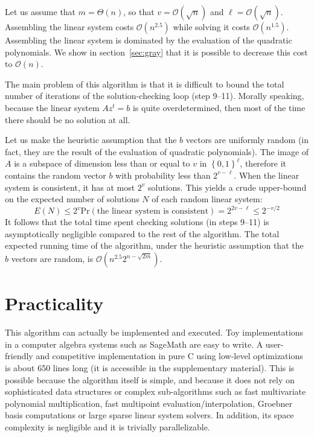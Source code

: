 \documentclass[a4paper,UKenglish,cleveref, autoref]{lipics-v2019}
\newcommand{\bits}{\left\{0, 1\right\}}
\newcommand{\bigO}[1]{\ensuremath{\mathcal{O}\left( #1 \right)} }
\newcommand{\bigTheta}[1]{\ensuremath{\Theta\left( #1 \right)} }
\begin{document}
Let us assume that $m = \bigTheta{n}$, so that $v = \bigO{\sqrt{n}}$ and
$\ell = \bigO{\sqrt{n}}$. Assembling the linear system costs $\bigO{n^{2.5}}$
while solving it costs $\bigO{n^{1.5}}$. Assembling the linear system is
dominated by the evaluation of the quadratic polynomials. We show in
section~\ref{sec:gray} that it is possible to decrease this cost to $\bigO{n}$.

The main problem of this algorithm is that it is difficult to bound the total
number of iterations of the solution-checking loop (step 9--11). Morally
speaking, because the linear system $A z^t = b$ is quite overdetermined, then most
of the time there should be no solution at all.

Let us make the heuristic assumption that the $b$ vectors are uniformly random
(in fact, they are the result of the evaluation of quadratic polynomials). The
image of $A$ is a subspace of dimension less than or equal to $v$ in
$\bits^\ell$, therefore it contains the random vector $b$ with probability less
than $2^{v-\ell}$. When the linear system is consistent, it has at most $2^v$
solutions. This yields a crude upper-bound on the expected number of solutions
$N$ of each random linear system:
\[
E(N) \leq 2^v \mathrm{Pr}(\text{the linear system is consistent}) = 2^{2v - \ell} \leq 2^{-v/2}
\]
It follows that the total time spent checking solutions (in steps 9--11) is
asymptotically negligible compared to the rest of the algorithm.  The total
expected running time of the algorithm, under the heuristic assumption that the
$b$ vectors are random, is $\bigO{n^{2.5} 2^{n - \sqrt{2m}}}$.


\section{Practicality}

This algorithm can actually be implemented and executed. Toy implementations in
a computer algebra systems such as \textsf{SageMath} are easy to write. A
user-friendly and competitive implementation in pure C using low-level
optimizations is about 650 lines long (it is accessible in the supplementary
material). This is possible because the algorithm itself is simple, and because
it does not rely on sophisticated data structures or complex sub-algorithms such
as fast multivariate polynomial multiplication, fast multipoint
evaluation/interpolation, Groebner basis computations or large sparse linear
system solvers. In addition, its space complexity is negligible and it is
trivially parallelizable.
\end{document}
